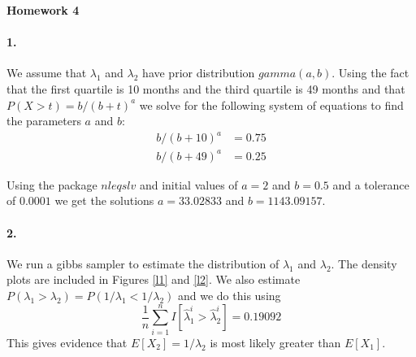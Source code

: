 \documentclass[12pt, leqno]{article}
\begin{document}
\pagestyle{fancy}

\begin{center}
{\large {\bf Homework 4}} \\
\end{center}
\paragraph{1.}
We assume that $\lambda_1$ and $\lambda_2$ have prior distribution
$gamma(a,b)$. Using the fact that the first quartile is 10 months and
the third quartile is 49 months and that $P(X>t) = b/(b+t)^a$ we solve for the following system of
equations to find the parameters $a$ and $b$:
\begin{align}
b/(b+10)^a &= 0.75 \\
b/(b+49)^a &= 0.25 
\end{align}

Using the package $nleqslv$ and initial values of $a = 2$ and $b =
0.5$ and a tolerance of $0.0001$ we get the solutions $a = 33.02833$ 
and $b = 1143.09157$.

\paragraph{2.}
We run a gibbs sampler to estimate the distribution of $\lambda_1$ and
$\lambda_2$. The density plots are included in Figures \ref{l1} and
\ref{l2}. We also estimate ${P(\lambda_1>\lambda_2)} = P(1/\lambda_1<1/\lambda_2)$ and we
do this using 
\[ \frac{1}{n} \sum_{i=1}^n I[\hat{\lambda}_1^i>\hat{\lambda}_2^i] =
0.19092
\]
This gives evidence that $E[X_2] = 1/ \lambda_2$ is most likely
greater than $E[X_1]$.
\end{document}
